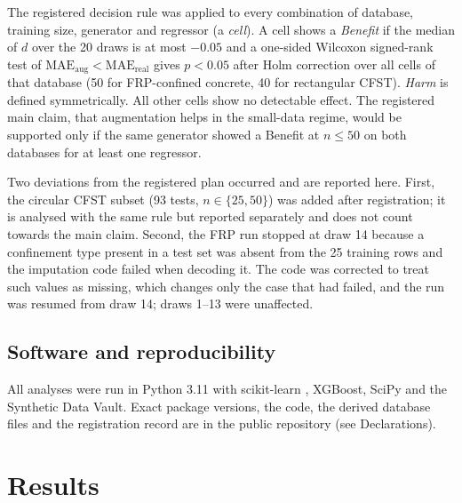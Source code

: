 \documentclass[pdflatex,sn-basic]{sn-jnl}
\begin{document}
The registered decision rule was applied to every combination of database, training size, generator and
regressor (a \emph{cell}). A cell shows a \emph{Benefit} if the median of $d$ over the 20 draws is at most
$-0.05$ and a one-sided Wilcoxon signed-rank test \citep{wilcoxon1945} of $\mathrm{MAE}_\mathrm{aug} <
\mathrm{MAE}_\mathrm{real}$ gives $p < 0.05$ after Holm correction \citep{holm1979} over all cells of that
database (50 for FRP-confined concrete, 40 for rectangular CFST). \emph{Harm} is defined symmetrically. All other
cells show no detectable effect. The registered main claim, that augmentation helps in the small-data regime,
would be supported only if the same generator showed a Benefit at $n \leq 50$ on both databases for at least one
regressor.

Two deviations from the registered plan occurred and are reported here. First, the circular CFST subset (93
tests, $n \in \{25, 50\}$) was added after registration; it is analysed with the same rule but reported separately
and does not count towards the main claim. Second, the FRP run stopped at draw 14 because a confinement type
present in a test set was absent from the 25 training rows and the imputation code failed when decoding it. The
code was corrected to treat such values as missing, which changes only the case that had failed, and the run was
resumed from draw 14; draws 1--13 were unaffected.

\subsection{Software and reproducibility}
All analyses were run in Python 3.11 with scikit-learn \citep{pedregosa2011sklearn}, XGBoost, SciPy and the
Synthetic Data Vault. Exact package versions, the code, the derived database files and the registration record
are in the public repository (see Declarations).

\section{Results}\label{sec:results}
\end{document}

